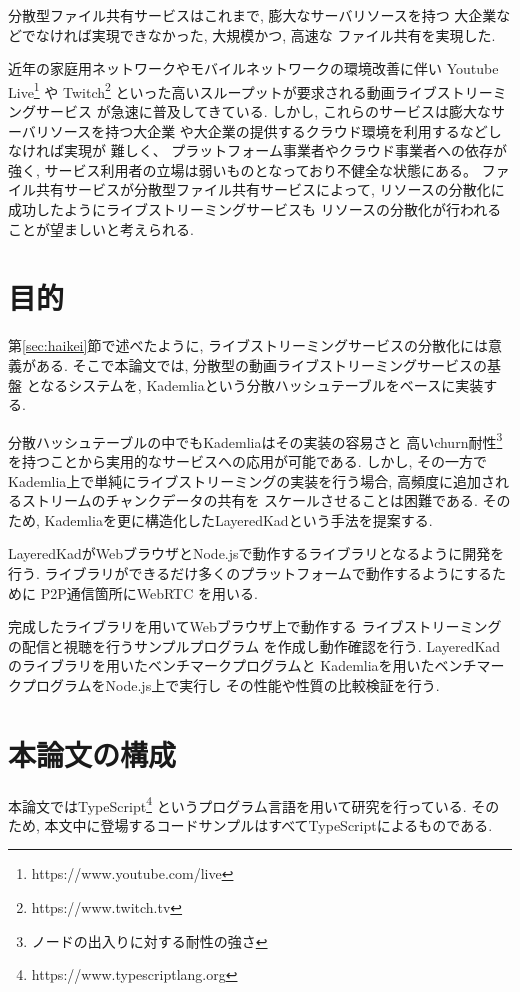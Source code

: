 \documentclass[sotsuron]{jcsie}
\begin{document}
分散型ファイル共有サービスはこれまで, 膨大なサーバリソースを持つ
大企業などでなければ実現できなかった, 大規模かつ, 高速な
ファイル共有を実現した.

近年の家庭用ネットワークやモバイルネットワークの環境改善に伴い
Youtube Live\footnote{https://www.youtube.com/live} や 
Twitch\footnote{https://www.twitch.tv} 
といった高いスループットが要求される動画ライブストリーミングサービス
が急速に普及してきている.
しかし, これらのサービスは膨大なサーバリソースを持つ大企業
や大企業の提供するクラウド環境を利用するなどしなければ実現が
難しく、 プラットフォーム事業者やクラウド事業者への依存が強く, 
サービス利用者の立場は弱いものとなっており不健全な状態にある。
ファイル共有サービスが分散型ファイル共有サービスによって, 
リソースの分散化に成功したようにライブストリーミングサービスも
リソースの分散化が行われることが望ましいと考えられる.

\section{目的}
第\ref{sec:haikei}節で述べたように, 
ライブストリーミングサービスの分散化には意義がある.
そこで本論文では, 分散型の動画ライブストリーミングサービスの基盤
となるシステムを, Kademliaという分散ハッシュテーブルをベースに実装する.

分散ハッシュテーブルの中でもKademliaはその実装の容易さと
高いchurn耐性\footnote{ノードの出入りに対する耐性の強さ}
を持つことから実用的なサービスへの応用が可能である.
しかし, その一方でKademlia上で単純にライブストリーミングの実装を行う場合, 
高頻度に追加されるストリームのチャンクデータの共有を
スケールさせることは困難である.
そのため, Kademliaを更に構造化したLayeredKadという手法を提案する.

LayeredKadがWebブラウザとNode.jsで動作するライブラリとなるように開発を行う.
ライブラリができるだけ多くのプラットフォームで動作するようにするために
P2P通信箇所にWebRTC \cite{WebRTCHo80:online}を用いる.

完成したライブラリを用いてWebブラウザ上で動作する
ライブストリーミングの配信と視聴を行うサンプルプログラム
を作成し動作確認を行う.
LayeredKadのライブラリを用いたベンチマークプログラムと
Kademliaを用いたベンチマークプログラムをNode.js上で実行し
その性能や性質の比較検証を行う.

\section{本論文の構成}
本論文ではTypeScript\footnote{https://www.typescriptlang.org}
というプログラム言語を用いて研究を行っている.
そのため, 本文中に登場するコードサンプルはすべてTypeScriptによるものである.
\end{document}
